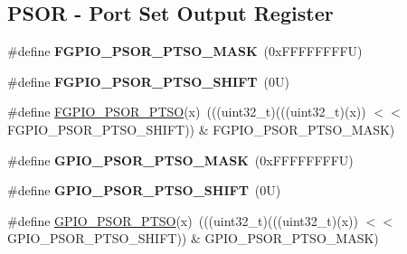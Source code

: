 \subsection*{P\+S\+OR -\/ Port Set Output Register}
\begin{DoxyCompactItemize}
\item 
\mbox{\label{group___f_g_p_i_o___register___masks_gae9ca2771800b24b305bfa09312e2ee3e}} 
\#define {\bfseries F\+G\+P\+I\+O\+\_\+\+P\+S\+O\+R\+\_\+\+P\+T\+S\+O\+\_\+\+M\+A\+SK}~(0x\+F\+F\+F\+F\+F\+F\+F\+F\+U)
\item 
\mbox{\label{group___f_g_p_i_o___register___masks_ga8a5cd9350700e90d57dfc2d6b27f9184}} 
\#define {\bfseries F\+G\+P\+I\+O\+\_\+\+P\+S\+O\+R\+\_\+\+P\+T\+S\+O\+\_\+\+S\+H\+I\+FT}~(0\+U)
\item 
\#define \mbox{\hyperlink{group___f_g_p_i_o___register___masks_gab91ddcf26e7cb532e95e1aadef87b8a9}{F\+G\+P\+I\+O\+\_\+\+P\+S\+O\+R\+\_\+\+P\+T\+SO}}(x)~(((uint32\+\_\+t)(((uint32\+\_\+t)(x)) $<$$<$ F\+G\+P\+I\+O\+\_\+\+P\+S\+O\+R\+\_\+\+P\+T\+S\+O\+\_\+\+S\+H\+I\+FT)) \& F\+G\+P\+I\+O\+\_\+\+P\+S\+O\+R\+\_\+\+P\+T\+S\+O\+\_\+\+M\+A\+SK)
\item 
\mbox{\label{group___f_g_p_i_o___register___masks_gaa8a48e38ef70ff1ba3bbcbf31b891da4}} 
\#define {\bfseries G\+P\+I\+O\+\_\+\+P\+S\+O\+R\+\_\+\+P\+T\+S\+O\+\_\+\+M\+A\+SK}~(0x\+F\+F\+F\+F\+F\+F\+F\+F\+U)
\item 
\mbox{\label{group___f_g_p_i_o___register___masks_ga5a962b85e07477e26afe639c7ca478cb}} 
\#define {\bfseries G\+P\+I\+O\+\_\+\+P\+S\+O\+R\+\_\+\+P\+T\+S\+O\+\_\+\+S\+H\+I\+FT}~(0\+U)
\item 
\#define \mbox{\hyperlink{group___f_g_p_i_o___register___masks_ga6b16f5841a5c5f20311eafc574f814e4}{G\+P\+I\+O\+\_\+\+P\+S\+O\+R\+\_\+\+P\+T\+SO}}(x)~(((uint32\+\_\+t)(((uint32\+\_\+t)(x)) $<$$<$ G\+P\+I\+O\+\_\+\+P\+S\+O\+R\+\_\+\+P\+T\+S\+O\+\_\+\+S\+H\+I\+FT)) \& G\+P\+I\+O\+\_\+\+P\+S\+O\+R\+\_\+\+P\+T\+S\+O\+\_\+\+M\+A\+SK)
\end{DoxyCompactItemize}
